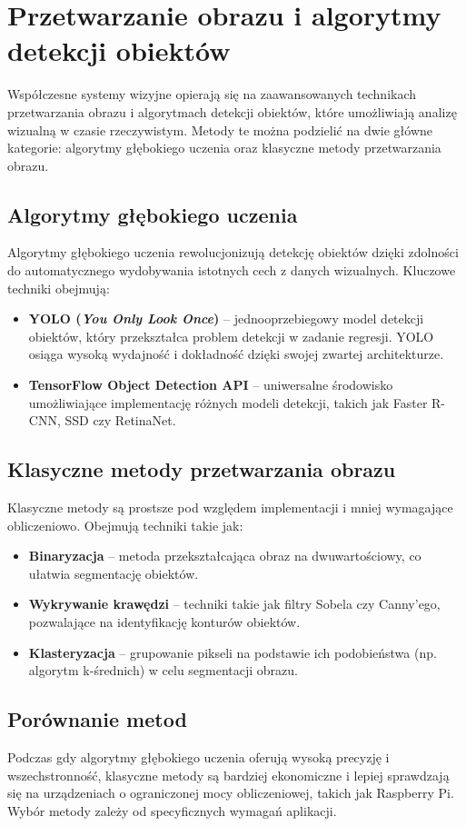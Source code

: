 \documentclass[a4paper,twoside,12pt]{book}
\begin{document}
\section{Przetwarzanie obrazu i algorytmy detekcji obiektów}
Współczesne systemy wizyjne opierają się na zaawansowanych technikach przetwarzania obrazu i algorytmach detekcji obiektów, które umożliwiają analizę wizualną w czasie rzeczywistym. Metody te można podzielić na dwie główne kategorie: algorytmy głębokiego uczenia oraz klasyczne metody przetwarzania obrazu.

\subsection{Algorytmy głębokiego uczenia}
Algorytmy głębokiego uczenia rewolucjonizują detekcję obiektów dzięki zdolności do automatycznego wydobywania istotnych cech z danych wizualnych. Kluczowe techniki obejmują:
\begin{itemize}
    \item \textbf{YOLO (\textit{You Only Look Once})} – jednooprzebiegowy model detekcji obiektów, który przekształca problem detekcji w zadanie regresji. YOLO osiąga wysoką wydajność i dokładność dzięki swojej zwartej architekturze.
    \item \textbf{TensorFlow Object Detection API} – uniwersalne środowisko umożliwiające implementację różnych modeli detekcji, takich jak Faster R-CNN, SSD czy RetinaNet.
\end{itemize}

\subsection{Klasyczne metody przetwarzania obrazu}
Klasyczne metody są prostsze pod względem implementacji i mniej wymagające obliczeniowo. Obejmują techniki takie jak:
\begin{itemize}
    \item \textbf{Binaryzacja} – metoda przekształcająca obraz na dwuwartościowy, co ułatwia segmentację obiektów.
    \item \textbf{Wykrywanie krawędzi} – techniki takie jak filtry Sobela czy Canny'ego, pozwalające na identyfikację konturów obiektów.
    \item \textbf{Klasteryzacja} – grupowanie pikseli na podstawie ich podobieństwa (np. algorytm k-średnich) w celu segmentacji obrazu.
\end{itemize}

\subsection{Porównanie metod}
Podczas gdy algorytmy głębokiego uczenia oferują wysoką precyzję i wszechstronność, klasyczne metody są bardziej ekonomiczne i lepiej sprawdzają się na urządzeniach o ograniczonej mocy obliczeniowej, takich jak Raspberry Pi. Wybór metody zależy od specyficznych wymagań aplikacji.
\end{document}
